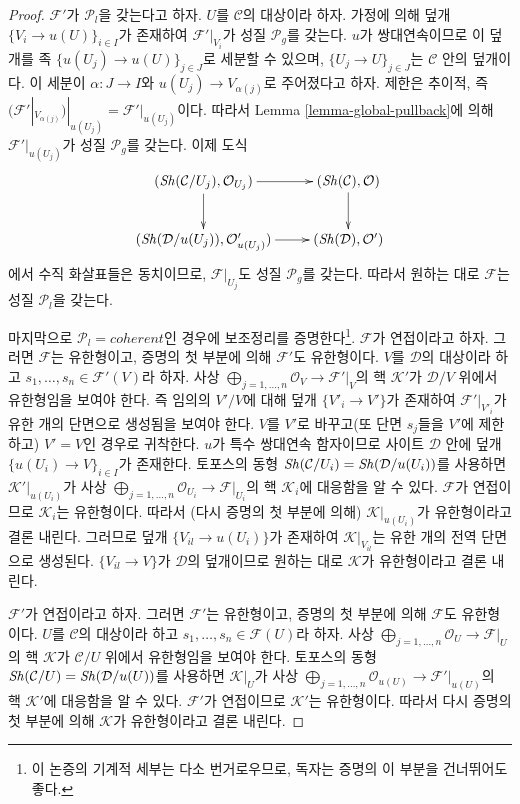 \begin{proof}
\medskip\noindent
$\mathcal{F}'$가 $\mathcal{P}_l$을 갖는다고 하자. $U$를 $\mathcal{C}$의
대상이라 하자. 가정에 의해 덮개 $\{V_i \to u(U)\}_{i \in I}$가 존재하여
$\mathcal{F}'|_{V_i}$가 성질 $\mathcal{P}_g$를 갖는다. $u$가 쌍대연속이므로
이 덮개를 족 $\{u(U_j) \to u(U)\}_{j \in J}$로 세분할 수 있으며,
$\{U_j \to U\}_{j \in J}$는 $\mathcal{C}$ 안의 덮개이다. 이 세분이
$\alpha : J \to I$와 $u(U_j) \to V_{\alpha(j)}$로 주어졌다고 하자.
제한은 추이적, 즉
$(\mathcal{F}'|_{V_{\alpha(j)}})|_{u(U_j)} = \mathcal{F}'|_{u(U_j)}$이다.
따라서 Lemma \ref{lemma-global-pullback}에 의해
$\mathcal{F}'|_{u(U_j)}$가 성질 $\mathcal{P}_g$를 갖는다. 이제 도식
$$
\xymatrix{
(\Sh(\mathcal{C}/U_j), \mathcal{O}_{U_j}) \ar[r] \ar[d] &
(\Sh(\mathcal{C}), \mathcal{O}) \ar[d] \\
(\Sh(\mathcal{D}/u(U_j)), \mathcal{O}'_{u(U_j)})
\ar[r] &
(\Sh(\mathcal{D}), \mathcal{O}')
}
$$
에서 수직 화살표들은 동치이므로, $\mathcal{F}|_{U_j}$도 성질
$\mathcal{P}_g$를 갖는다. 따라서 원하는 대로 $\mathcal{F}$는 성질
$\mathcal{P}_l$을 갖는다.

\medskip\noindent
마지막으로 $\mathcal{P}_l = coherent$인 경우에 보조정리를 증명한다\footnote{이
논증의 기계적 세부는 다소 번거로우므로, 독자는 증명의 이 부분을 건너뛰어도
좋다.}. $\mathcal{F}$가 연접이라고 하자. 그러면 $\mathcal{F}$는 유한형이고,
증명의 첫 부분에 의해 $\mathcal{F}'$도 유한형이다. $V$를 $\mathcal{D}$의
대상이라 하고 $s_1, \ldots, s_n \in \mathcal{F}'(V)$라 하자. 사상
$\bigoplus_{j = 1, \ldots, n} \mathcal{O}_V \to \mathcal{F}'|_V$의 핵
$\mathcal{K}'$가 $\mathcal{D}/V$ 위에서 유한형임을 보여야 한다. 즉 임의의
$V'/V$에 대해 덮개 $\{V'_i \to V'\}$가 존재하여
$\mathcal{F}'|_{V'_i}$가 유한 개의 단면으로 생성됨을 보여야 한다. $V$를
$V'$로 바꾸고(또 단면 $s_j$들을 $V'$에 제한하고) $V' = V$인 경우로
귀착한다. $u$가 특수 쌍대연속 함자이므로 사이트 $\mathcal{D}$ 안에 덮개
$\{u(U_i) \to V\}_{i \in I}$가 존재한다. 토포스의 동형
$\mathop{\mathit{Sh}}\nolimits(\mathcal{C}/U_i) = \mathop{\mathit{Sh}}\nolimits(\mathcal{D}/u(U_i))$를 사용하면
$\mathcal{K}'|_{u(U_i)}$가 사상
$\bigoplus_{j = 1, \ldots, n} \mathcal{O}_{U_i} \to \mathcal{F}|_{U_i}$의
핵 $\mathcal{K}_i$에 대응함을 알 수 있다. $\mathcal{F}$가 연접이므로
$\mathcal{K}_i$는 유한형이다. 따라서 (다시 증명의 첫 부분에 의해)
$\mathcal{K}|_{u(U_i)}$가 유한형이라고 결론 내린다. 그러므로 덮개
$\{V_{il} \to u(U_i)\}$가 존재하여 $\mathcal{K}|_{V_{il}}$는 유한 개의
전역 단면으로 생성된다. $\{V_{il} \to V\}$가 $\mathcal{D}$의 덮개이므로
원하는 대로 $\mathcal{K}$가 유한형이라고 결론 내린다.

\medskip\noindent
$\mathcal{F}'$가 연접이라고 하자. 그러면 $\mathcal{F}'$는 유한형이고,
증명의 첫 부분에 의해 $\mathcal{F}$도 유한형이다. $U$를 $\mathcal{C}$의
대상이라 하고 $s_1, \ldots, s_n \in \mathcal{F}(U)$라 하자. 사상
$\bigoplus_{j = 1, \ldots, n} \mathcal{O}_U \to \mathcal{F}|_U$의 핵
$\mathcal{K}$가 $\mathcal{C}/U$ 위에서 유한형임을 보여야 한다. 토포스의
동형 $\mathop{\mathit{Sh}}\nolimits(\mathcal{C}/U) = \mathop{\mathit{Sh}}\nolimits(\mathcal{D}/u(U))$를 사용하면
$\mathcal{K}|_U$가 사상
$\bigoplus_{j = 1, \ldots, n} \mathcal{O}_{u(U)} \to \mathcal{F}'|_{u(U)}$의
핵 $\mathcal{K}'$에 대응함을 알 수 있다. $\mathcal{F}'$가 연접이므로
$\mathcal{K}'$는 유한형이다. 따라서 다시 증명의 첫 부분에 의해
$\mathcal{K}$가 유한형이라고 결론 내린다.
\end{proof}

